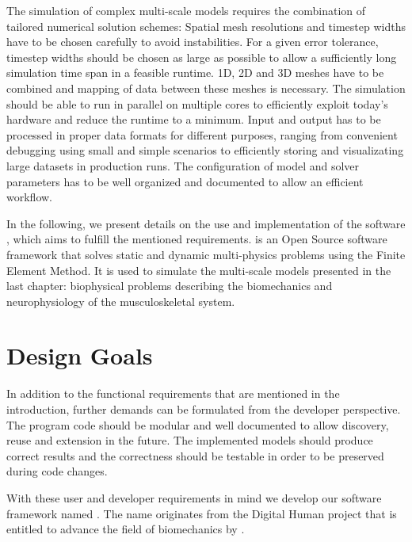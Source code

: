 
The simulation of complex multi-scale models requires the combination of tailored numerical solution schemes: Spatial mesh resolutions and timestep widths have to be chosen carefully to avoid instabilities. For a given error tolerance, timestep widths should be chosen as large as possible to allow  a sufficiently long simulation time span in a feasible runtime.
1D, 2D and 3D meshes have to be combined and mapping of data between these meshes is necessary. 
The simulation should be able to run in parallel on multiple cores to efficiently exploit today's hardware and reduce the runtime to a minimum. Input and output has to be processed in proper data formats for different purposes, ranging from convenient debugging using small and simple scenarios to efficiently storing and visualizating large datasets in production runs. The configuration of model and solver parameters has to be well organized and documented to allow an efficient workflow.

In the following, we present details on the use and implementation of the software \opendihu{}, which aims to fulfill the mentioned requirements. 
\Opendihu{} is an Open Source software framework that solves static and dynamic multi-physics problems using the Finite Element Method. 
It is used to simulate the multi-scale models presented in the last chapter: biophysical problems describing the biomechanics and neurophysiology of the musculoskeletal system.

\section{Design Goals}

In addition to the functional requirements that are mentioned in the introduction, further demands can be formulated from the developer perspective.
The program code should be modular and well documented to allow discovery, reuse and extension in the future. The implemented models should produce correct results and the correctness should be testable in order to be preserved during code changes.

With these user and developer requirements in mind we develop our software framework named \opendihu{}.
The name originates from the Digital Human project that is entitled to advance the field of biomechanics by  \cite{DihuWeb}.

